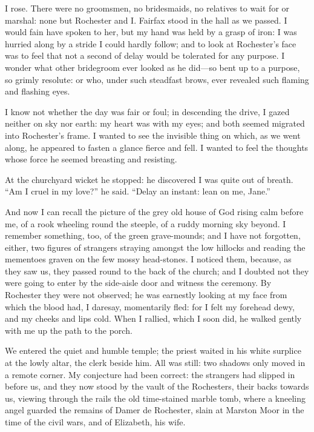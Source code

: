 I rose. There were no groomsmen, no bridesmaids, no relatives to wait
for or marshal: none but \Mr{} Rochester and I\@. \Mrs{} Fairfax stood in the
hall as we passed.  I would fain have spoken to her, but my hand was
held by a grasp of iron: I was hurried along by a stride I could hardly
follow; and to look at \Mr{} Rochester's face was to feel that not a
second of delay would be tolerated for any purpose. I wonder what other
bridegroom ever looked as he did---so bent up to a purpose, so grimly
resolute: or who, under such steadfast brows, ever revealed such flaming
and flashing eyes.

I know not whether the day was fair or foul; in descending the drive, I
gazed neither on sky nor earth: my heart was with my eyes; and both
seemed migrated into \Mr{} Rochester's frame. I wanted to see the
invisible thing on which, as we went along, he appeared to fasten a
glance fierce and fell. I wanted to feel the thoughts whose force he
seemed breasting and resisting.

At the churchyard wicket he stopped: he discovered I was quite out of
breath. \enquote{Am I cruel in my love?} he said. \enquote{Delay an
instant: lean on me, Jane.}

And now I can recall the picture of the grey old house of God rising
calm before me, of a rook wheeling round the steeple, of a ruddy morning
sky beyond. I remember something, too, of the green grave-mounds; and I
have not forgotten, either, two figures of strangers straying amongst
the low hillocks and reading the mementoes graven on the few mossy
head-stones. I noticed them, because, as they saw us, they passed round
to the back of the church; and I doubted not they were going to enter by
the side-aisle door and witness the ceremony. By \Mr{} Rochester they
were not observed; he was earnestly looking at my face from which the
blood had, I daresay, momentarily fled: for I felt my forehead dewy, and
my cheeks and lips cold. When I rallied, which I soon did, he walked
gently with me up the path to the porch.

We entered the quiet and humble temple; the priest waited in his white
surplice at the lowly altar, the clerk beside him. All was still: two
shadows only moved in a remote corner. My conjecture had been correct:
the strangers had slipped in before us, and they now stood by the vault
of the Rochesters, their backs towards us, viewing through the rails the
old time-stained marble tomb, where a kneeling angel guarded the remains
of Damer de Rochester, slain at Marston Moor in the time of the civil
wars, and of Elizabeth, his wife.

